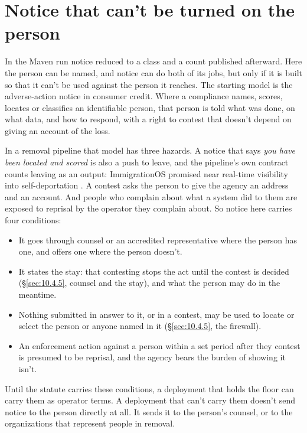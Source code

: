 \section{Notice that can't be turned on the person}
\label{sec:10.6}
In the Maven run notice reduced to a class and a count published afterward. Here the person can be named, and notice can do both of its jobs, but only if it is built so that it can't be used against the person it reaches. The starting model is the adverse-action notice in consumer credit. Where a compliance names, scores, locates or classifies an identifiable person, that person is told what was done, on what data, and how to respond, with a right to contest that doesn't depend on giving an account of the loss.

In a removal pipeline that model has three hazards. A notice that says \emph{you have been located and scored} is also a push to leave, and the pipeline's own contract counts leaving as an output: ImmigrationOS promised near real-time visibility into self-deportation \autocite{Ho2025ImmigrationOS}. A contest asks the person to give the agency an address and an account. And people who complain about what a system did to them are exposed to reprisal by the operator they complain about. So notice here carries four conditions:

\begin{itemize}
\item It goes through counsel or an accredited representative where the person has one, and offers one where the person doesn't.
\item It states the stay: that contesting stops the act until the contest is decided (\S\ref{sec:10.4.5}, counsel and the stay), and what the person may do in the meantime.
\item Nothing submitted in answer to it, or in a contest, may be used to locate or select the person or anyone named in it (\S\ref{sec:10.4.5}, the firewall).
\item An enforcement action against a person within a set period after they contest is presumed to be reprisal, and the agency bears the burden of showing it isn't.
\end{itemize}

Until the statute carries these conditions, a deployment that holds the floor can carry them as operator terms. A deployment that can't carry them doesn't send notice to the person directly at all. It sends it to the person's counsel, or to the organizations that represent people in removal.

